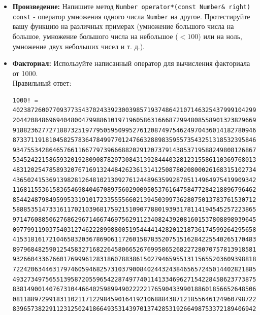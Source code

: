 \documentclass{article}
\begin{document}
\begin{itemize}
\item \textbf{Произведение:} Напишите метод \texttt{Number operator*(const Number\& right) const} - оператор умножения одного числа \texttt{Number} на другое. Протестируйте вашу функцию на различных примерах (умножение большого числа на большое, умножение большого числа на небольшое ($< 100$) или на ноль, умножение двух небольших чисел и т. д.).\\
\item \textbf{Факториал:} Используйте написанный оператор для вычисления факториала от 1000. \\
Правильный ответ:
\begin{verbatim}
1000! = 40238726007709377354370243392300398571937486421071463254379991042993851239862902059
2044208486969404800479988610197196058631666872994808558901323829669944590997424504087073759
9188236277271887325197795059509952761208749754624970436014182780946464962910563938874378864
8733711918104582578364784997701247663288983595573543251318532395846307555740911426241747434
9347553428646576611667797396668820291207379143853719588249808126867838374559731746136085379
5345242215865932019280908782973084313928444032812315586110369768013573042161687476096758713
4831202547858932076716913244842623613141250878020800026168315102734182797770478463586817016
4365024153691398281264810213092761244896359928705114964975419909342221566832572080821333186
1168115536158365469840467089756029009505376164758477284218896796462449451607653534081989013
8544248798495995331910172335555660213945039973628075013783761530712776192684903435262520001
5888535147331611702103968175921510907788019393178114194545257223865541461062892187960223838
9714760885062768629671466746975629112340824392081601537808898939645182632436716167621791689
0977991190375403127462228998800519544441428201218736174599264295658174662830295557029902432
4153181617210465832036786906117260158783520751516284225540265170483304226143974286933061690
8979684825901254583271682264580665267699586526822728070757813918581788896522081643483448259
9326604336766017699961283186078838615027946595513115655203609398818061213855860030143569452
7224206344631797460594682573103790084024432438465657245014402821885252470935190620929023136
4932734975655139587205596542287497740114133469627154228458623773875382304838656889764619273
8381490014076731044664025989949022222176590433990188601856652648506179970235619389701786004
0811889729918311021171229845901641921068884387121855646124960798722908519296819372388642614
8396573822911231250241866493531439701374285319266498753372189406942814341185201580141233448

\end{verbatim}
\end{itemize}
\end{document}
